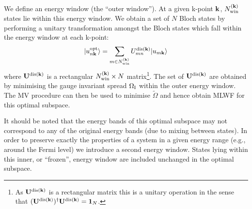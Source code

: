 We define an energy window (the ``outer window''). At a given
k-point $\bf{k}$, $N^{({\bf k})}_{{\rm win}}$ states lie within this
energy window. We obtain a set of $N$ Bloch states by
performing a unitary transformation amongst the Bloch states which
fall within the energy window at each k-point: 
 \begin{equation}
| u_{n{\bf k}}^{{\rm opt}}\rangle = \sum_{m\in N^{({\bf k})}_{{\rm win}}}
U^{{\rm dis}({\bf k})}_{mn} | u_{m{\bf k}}\rangle
\end{equation}
where $\bf{U}^{{\rm dis}({\bf k})}$ is a rectangular $N^{({\bf k})}_{{\rm win}} \times N$
 matrix\footnote{As ${\bf U}^{{\rm dis}({\bf k})}$ is a rectangular
 matrix this is a unitary operation in the sense that $({\bf U}^{{\rm
 dis}({\bf k})})^{\dagger}{\bf U}^{{\rm dis}({\bf k})}={\bf 1}_N$.}. The
 set of $\bf{U}^{{\rm dis}({\bf k})}$ are obtained by minimising 
 the gauge invariant spread $\Omega_{{\rm I}}$ within the outer energy
 window. The MV procedure can then be used to minimise $\tilde{\Omega}$
 and hence obtain MLWF for this optimal subspace.

It should be noted that the energy bands of this optimal subspace may
not correspond to any of the original energy bands (due to mixing
between states). In order to preserve exactly the properties of a
system in a given energy range (e.g., around the Fermi level) we
introduce a second  energy window. States lying within this inner, or
``frozen'', energy window are included unchanged in the optimal
subspace.
